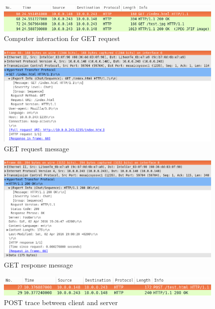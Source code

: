\documentclass[10pt,twocolumn]{witseiepaper}
\begin{document}
		\begin{figure}[h!]
			\centering
			\includegraphics[width=\columnwidth]{resources/get_html}
			\caption{Computer interaction for GET request}
			\label{fig:basic_get}
		\end{figure}
		
		\begin{figure}[h!]
			\centering
			\includegraphics[width=\columnwidth]{resources/message_get_html}
			\caption{GET request message}
			\label{fig:basic_get_message}
		\end{figure}
		
		\begin{figure}[h!]
			\centering
			\includegraphics[width=\columnwidth]{resources/message_get_response_html}
			\caption{GET response message}
			\label{fig:basic_get_response}
		\end{figure}
		
		\begin{figure}[h!]
			\centering
			\includegraphics[width=\columnwidth]{resources/post_request}
			\caption{POST trace between client and server}
			\label{fig:basic_post}
		\end{figure}
		
\end{document}
